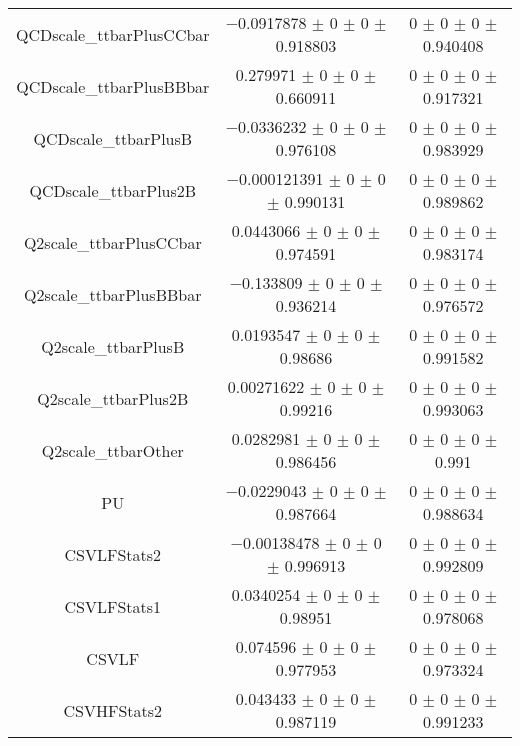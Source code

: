 \begin{table}
\begin{tabular}{ccc}
QCDscale\_ttbarPlusCCbar 	& \num{-0.0917878} $\pm$ \num{0} $\pm$ \num{0} $\pm$ \num{0.918803} 	& \num{0} $\pm$ \num{0} $\pm$ \num{0} $\pm$ \num{0.940408}\\
QCDscale\_ttbarPlusBBbar 	& \num{0.279971} $\pm$ \num{0} $\pm$ \num{0} $\pm$ \num{0.660911} 	& \num{0} $\pm$ \num{0} $\pm$ \num{0} $\pm$ \num{0.917321}\\
QCDscale\_ttbarPlusB 	& \num{-0.0336232} $\pm$ \num{0} $\pm$ \num{0} $\pm$ \num{0.976108} 	& \num{0} $\pm$ \num{0} $\pm$ \num{0} $\pm$ \num{0.983929}\\
QCDscale\_ttbarPlus2B 	& \num{-0.000121391} $\pm$ \num{0} $\pm$ \num{0} $\pm$ \num{0.990131} 	& \num{0} $\pm$ \num{0} $\pm$ \num{0} $\pm$ \num{0.989862}\\
Q2scale\_ttbarPlusCCbar 	& \num{0.0443066} $\pm$ \num{0} $\pm$ \num{0} $\pm$ \num{0.974591} 	& \num{0} $\pm$ \num{0} $\pm$ \num{0} $\pm$ \num{0.983174}\\
Q2scale\_ttbarPlusBBbar 	& \num{-0.133809} $\pm$ \num{0} $\pm$ \num{0} $\pm$ \num{0.936214} 	& \num{0} $\pm$ \num{0} $\pm$ \num{0} $\pm$ \num{0.976572}\\
Q2scale\_ttbarPlusB 	& \num{0.0193547} $\pm$ \num{0} $\pm$ \num{0} $\pm$ \num{0.98686} 	& \num{0} $\pm$ \num{0} $\pm$ \num{0} $\pm$ \num{0.991582}\\
Q2scale\_ttbarPlus2B 	& \num{0.00271622} $\pm$ \num{0} $\pm$ \num{0} $\pm$ \num{0.99216} 	& \num{0} $\pm$ \num{0} $\pm$ \num{0} $\pm$ \num{0.993063}\\
Q2scale\_ttbarOther 	& \num{0.0282981} $\pm$ \num{0} $\pm$ \num{0} $\pm$ \num{0.986456} 	& \num{0} $\pm$ \num{0} $\pm$ \num{0} $\pm$ \num{0.991}\\
PU 	& \num{-0.0229043} $\pm$ \num{0} $\pm$ \num{0} $\pm$ \num{0.987664} 	& \num{0} $\pm$ \num{0} $\pm$ \num{0} $\pm$ \num{0.988634}\\
CSVLFStats2 	& \num{-0.00138478} $\pm$ \num{0} $\pm$ \num{0} $\pm$ \num{0.996913} 	& \num{0} $\pm$ \num{0} $\pm$ \num{0} $\pm$ \num{0.992809}\\
CSVLFStats1 	& \num{0.0340254} $\pm$ \num{0} $\pm$ \num{0} $\pm$ \num{0.98951} 	& \num{0} $\pm$ \num{0} $\pm$ \num{0} $\pm$ \num{0.978068}\\
CSVLF 	& \num{0.074596} $\pm$ \num{0} $\pm$ \num{0} $\pm$ \num{0.977953} 	& \num{0} $\pm$ \num{0} $\pm$ \num{0} $\pm$ \num{0.973324}\\
CSVHFStats2 	& \num{0.043433} $\pm$ \num{0} $\pm$ \num{0} $\pm$ \num{0.987119} 	& \num{0} $\pm$ \num{0} $\pm$ \num{0} $\pm$ \num{0.991233}\\

\end{tabular}
\end{table}
